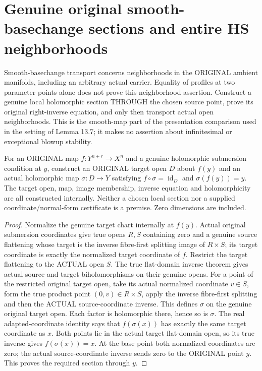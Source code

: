 \section{Genuine original smooth-basechange sections and entire HS neighborhoods}

Smooth-basechange transport concerns neighborhoods in the ORIGINAL ambient
manifolds, including an arbitrary actual carrier. Equality of profiles at
two parameter points alone does not prove this neighborhood assertion.
Construct a genuine local holomorphic section THROUGH the chosen source
point, prove its original right-inverse equation, and only then transport
actual open neighborhoods. This is the smooth-map part of the presentation
comparison used in the setting of Lemma 13.7; it makes no assertion about
infinitesimal or exceptional blowup stability.

\begin{theorem}
\label{hir:original-submersion-actual-local-holomorphic-section}
\leanok
For an ORIGINAL map $f:Y^{n+r}\to X^n$ and a genuine holomorphic
submersion condition at $y$, construct an ORIGINAL target open $D$ about
$f(y)$ and an actual holomorphic map $\sigma:D\to Y$ satisfying
$f\circ\sigma=\operatorname{id}_D$ and $\sigma(f(y))=y$. The target open,
map, image membership, inverse equation and holomorphicity are all
constructed internally. Neither a chosen local section nor a supplied
coordinate/normal-form certificate is a premise. Zero dimensions are
included.
\end{theorem}
\begin{proof}
Normalize the genuine target chart internally at $f(y)$. Actual original
submersion coordinates give true opens $R,S$ containing zero and a genuine
source flattening whose target is the inverse fibre-first splitting image
of $R\times S$; its target coordinate is exactly the normalized target
coordinate of $f$. Restrict the target flattening to the ACTUAL open $S$.
The true flat-domain inverse theorem gives actual source and target
biholomorphisms on their genuine opens. For a point of the restricted
original target open, take its actual normalized coordinate $v\in S$,
form the true product point $(0,v)\in R\times S$, apply the inverse
fibre-first splitting and then the ACTUAL source-coordinate inverse.
This defines $\sigma$ on the genuine original target open. Each factor
is holomorphic there, hence so is $\sigma$. The real adapted-coordinate
identity says that $f(\sigma(x))$ has exactly the same target coordinate
as $x$. Both points lie in the actual target flat-domain open, so its
true inverse gives $f(\sigma(x))=x$. At the base point both normalized
coordinates are zero; the actual source-coordinate inverse sends zero
to the ORIGINAL point $y$. This proves the required section through $y$.
\end{proof}

